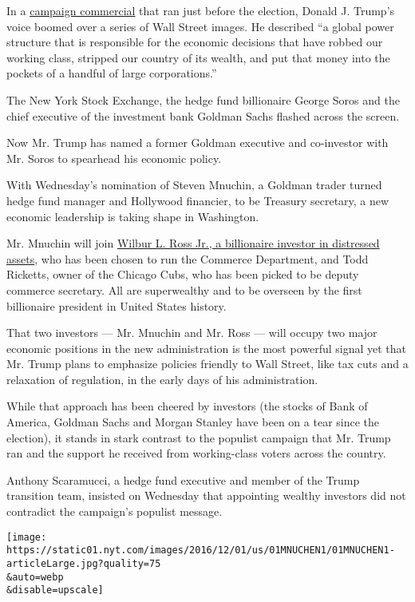 In a \href{https://www.youtube.com/watch?v=vST61W4bGm8}{campaign
commercial} that ran just before the election, Donald J. Trump's voice
boomed over a series of Wall Street images. He described ``a global
power structure that is responsible for the economic decisions that have
robbed our working class, stripped our country of its wealth, and put
that money into the pockets of a handful of large corporations.''

The New York Stock Exchange, the hedge fund billionaire George Soros and
the chief executive of the investment bank Goldman Sachs flashed across
the screen.

Now Mr. Trump has named a former Goldman executive and co-investor with
Mr. Soros to spearhead his economic policy.

With Wednesday's nomination of Steven Mnuchin, a Goldman trader turned
hedge fund manager and Hollywood financier, to be Treasury secretary, a
new economic leadership is taking shape in Washington.

Mr. Mnuchin will join
\href{http://www.nytimes.com/2016/11/25/business/dealbook/wilbur-ross-commerce-secretary-donald-trump.html}{Wilbur
L. Ross Jr., a billionaire investor in distressed assets}, who has been
chosen to run the Commerce Department, and Todd Ricketts, owner of the
Chicago Cubs, who has been picked to be deputy commerce secretary. All
are superwealthy and to be overseen by the first billionaire president
in United States history.

That two investors --- Mr. Mnuchin and Mr. Ross --- will occupy two
major economic positions in the new administration is the most powerful
signal yet that Mr. Trump plans to emphasize policies friendly to Wall
Street, like tax cuts and a relaxation of regulation, in the early days
of his administration.

While that approach has been cheered by investors (the stocks of Bank of
America, Goldman Sachs and Morgan Stanley have been on a tear since the
election), it stands in stark contrast to the populist campaign that Mr.
Trump ran and the support he received from working-class voters across
the country.

Anthony Scaramucci, a hedge fund executive and member of the Trump
transition team, insisted on Wednesday that appointing wealthy investors
did not contradict the campaign's populist message.

\texttt{[image: https://static01.nyt.com/images/2016/12/01/us/01MNUCHEN1/01MNUCHEN1-articleLarge.jpg?quality=75\\\&auto=webp\\\&disable=upscale]}

